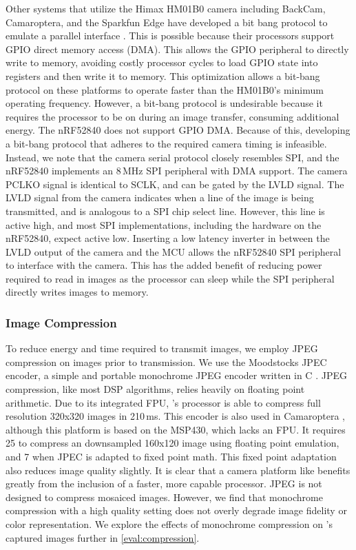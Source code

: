Other systems that utilize the Himax HM01B0 camera including BackCam, Camaroptera, and the Sparkfun Edge have developed a bit bang protocol to emulate a parallel interface \cite{josephson2019wireless, nardello2019camaroptera, sparkfunedge}. This is possible because their processors support GPIO direct memory access (DMA). This allows the GPIO peripheral to directly write to memory, avoiding costly processor cycles to load GPIO state into registers and then write it to memory. This optimization allows a bit-bang protocol on these platforms to operate faster than the HM01B0's minimum operating frequency. However, a bit-bang protocol is undesirable because it requires the processor to be on during an image transfer, consuming additional energy. The nRF52840 does not support GPIO DMA. 
Because of this, developing a bit-bang protocol that adheres to the required camera timing is infeasible. 
Instead, we note that the camera serial protocol closely resembles SPI, and the nRF52840 implements an 8\,MHz SPI peripheral with DMA support. 
The camera PCLKO signal is identical to SCLK, and can be gated by the LVLD signal. 
The LVLD signal from the camera indicates when a line of the image is being transmitted, and is analogous to a SPI chip select line. However, this line is active high, and most SPI implementations, including the hardware on the nRF52840, expect active low. Inserting a low latency inverter in between the LVLD output of the camera and the MCU allows the nRF52840 SPI peripheral to interface with the camera. 
This has the added benefit of reducing power required to read in images as the processor can sleep while the SPI peripheral directly writes images to memory.

\subsubsection{Image Compression}
To reduce energy and time required to transmit images, we employ JPEG compression on images prior to transmission. We use the Moodstocks JPEC encoder, a simple and portable monochrome JPEG encoder written in C \cite{moodstocks}. JPEG compression, like most DSP algorithms, relies heavily on floating point arithmetic. Due to its integrated FPU, \namec{}'s processor is able to compress full resolution 320x320 images in 210\,ms.
This encoder is also used in Camaroptera \cite{nardello2019camaroptera}, although this platform is based on the MSP430, which lacks an FPU. It requires 25 to compress an downsampled 160x120 image using floating point emulation, and 7 when JPEC is adapted to fixed point math. This fixed point adaptation also reduces image quality slightly. It is clear that a camera platform like \namec{} benefits greatly from the inclusion of a faster, more capable processor.
JPEG is not designed to compress mosaiced images. However, we find that monochrome compression with a high quality setting does not overly degrade image fidelity or color representation. We explore the effects of monochrome compression on \namec's captured images further in \cref{eval:compression}.

